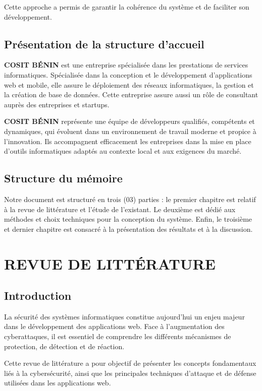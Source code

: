 \documentclass[a4paper,12pt]{report}
\begin{document}
    Cette approche a permis de garantir la cohérence du système et de faciliter son développement.
    
    \section{Présentation de la structure d'accueil}
    
    \textbf{COSIT BÉNIN} est une entreprise spécialisée dans les prestations de services informatiques. Spécialisée dans la conception et le développement d'applications web et mobile, elle assure le déploiement des réseaux informatiques, la gestion et la création de base de données. Cette entreprise assure aussi un rôle de consultant auprès des entreprises et startups.
    
    \textbf{COSIT BÉNIN} représente une équipe de développeurs qualifiés, compétents et dynamiques, qui évoluent dans un environnement de travail moderne et propice à l'innovation. Ils accompagnent efficacement les entreprises dans la mise en place d'outils informatiques adaptés au contexte local et aux exigences du marché.
    
    \section{Structure du mémoire}
    
    Notre document est structuré en trois (03) parties : le premier chapitre est relatif à la revue de littérature et l'étude de l'existant. Le deuxième est dédié aux méthodes et choix techniques pour la conception du système. Enfin, le troisième et dernier chapitre est consacré à la présentation des résultats et à la discussion.
    
    \chapter{REVUE DE LITTÉRATURE}
    
    \section{Introduction}
    
    La sécurité des systèmes informatiques constitue aujourd’hui un enjeu majeur dans le développement des applications web. Face à l’augmentation des cyberattaques, il est essentiel de comprendre les différents mécanismes de protection, de détection et de réaction.
    
    Cette revue de littérature a pour objectif de présenter les concepts fondamentaux liés à la cybersécurité, ainsi que les principales techniques d’attaque et de défense utilisées dans les applications web.
    
\end{document}
